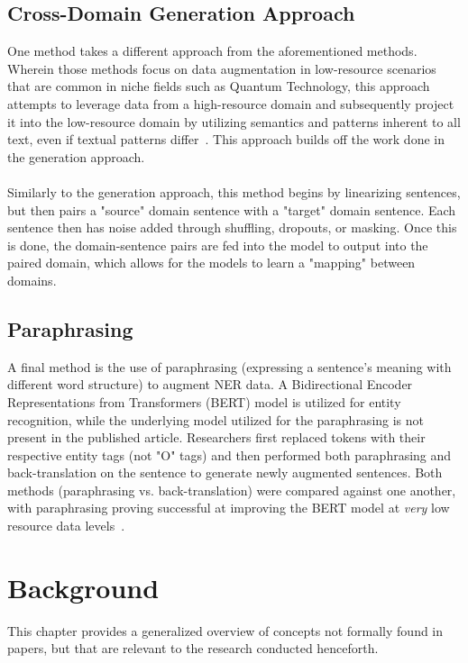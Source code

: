 \documentclass[12pt]{report}
\begin{document}
        
    \section{Cross-Domain Generation Approach}
        
        One method takes a different approach from the aforementioned methods. Wherein those methods focus on data augmentation in low-resource scenarios that are common in niche fields such as Quantum Technology, this approach attempts to leverage data from a high-resource domain and subsequently project it into the low-resource domain by utilizing semantics and patterns inherent to all text, even if textual patterns differ~\cite{Cross}. This approach builds off the work done in the generation approach.
        \\\\
        Similarly to the generation approach, this method begins by linearizing sentences, but then pairs a "source" domain sentence with a "target" domain sentence. Each sentence then has noise added through shuffling, dropouts, or masking. Once this is done, the domain-sentence pairs are fed into the model to output into the paired domain, which allows for the models to learn a "mapping" between domains.
    
    \section{Paraphrasing}
    
        A final method is the use of paraphrasing (expressing a sentence's meaning with different word structure) to augment NER data. A Bidirectional Encoder Representations from Transformers (BERT) model is utilized for entity recognition, while the underlying model utilized for the paraphrasing is not present in the published article. Researchers first replaced tokens with their respective entity tags (not "O" tags) and then performed both paraphrasing and back-translation on the sentence to generate newly augmented sentences. Both methods (paraphrasing vs. back-translation) were compared against one another, with paraphrasing proving successful at improving the BERT model at \textit{very} low resource data levels~\cite{Paraphrasing}.

\chapter{Background}
    This chapter provides a generalized overview of concepts not formally found in papers, but that are relevant to the research conducted henceforth.
    
\end{document}
